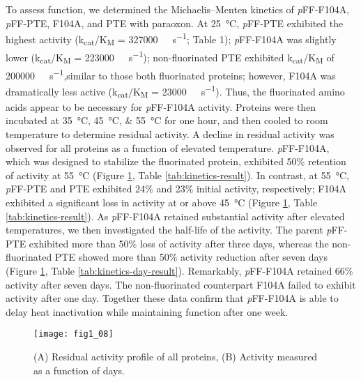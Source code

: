 \begin{refsection}
To assess function, we determined the Michaelis–Menten kinetics of
\emph{p}FF-F104A, \emph{p}FF-PTE, F104A, and PTE with paraoxon. At
\SI{25}{\celsius}, \emph{p}FF-PTE exhibited the highest activity
(k\textsubscript{cat}/K\textsubscript{M} = \SI{327000}{\per\Molar\per\second};
Table 1); \emph{p}FF-F104A was slightly lower
(k\textsubscript{cat}/K\textsubscript{M} = \SI{223000}{\per\Molar\per\second});
non-fluorinated PTE exhibited k\textsubscript{cat}/K\textsubscript{M} of
\SI{200000}{\per\Molar\per\second},similar to those both fluorinated proteins;
however, F104A was dramatically less active
(k\textsubscript{cat}/K\textsubscript{M} = \SI{23000}{\per\Molar\per\second}).
Thus, the fluorinated amino acids appear to be necessary for \emph{p}FF-F104A
activity.  Proteins were then incubated at \SIlist{35;45;55}{\celsius} for one
hour, and then cooled to room temperature to determine residual activity. A
decline in residual activity was observed for all proteins as a function of
elevated temperature. \emph{p}FF-F104A, which was designed to stabilize the
fluorinated protein, exhibited 50\% retention of activity at \SI{55}{\celsius}
(Figure \ref{fig:kinetics-fig}, Table \ref{tab:kinetics-result}). In contrast, at
\SI{55}{\celsius}, \emph{p}FF-PTE and PTE exhibited 24\% and 23\% initial
activity, respectively; F104A exhibited a significant loss in activity at or
above \SI{45}{\celsius} (Figure \ref{fig:kinetics-fig}, Table
\ref{tab:kinetics-result}). As \emph{p}FF-F104A retained substantial activity
after elevated temperatures, we then investigated the half-life of the
activity. The parent \emph{p}FF-PTE exhibited more than 50\% loss of activity
after three days, whereas the non-fluorinated PTE showed more than 50\%
activity reduction after seven days (Figure \ref{fig:kinetics-fig}, Table
\ref{tab:kinetics-day-result}).  Remarkably, \emph{p}FF-F104A retained 66\%
activity after seven days. The non-fluorinated counterpart F104A failed to
exhibit activity after one day.  Together these data confirm that
\emph{p}FF-F104A is able to delay heat inactivation while maintaining function
after one week.

\begin{figure}[h!] \centering \texttt{[image: fig1\_08]}
    \caption[(A) Residual activity profile of all proteins, (B) Activity
    measured as a function of days.]{(A) Residual activity profile of all
    proteins, (B) Activity measured as a function of days.} 
    \label{fig:kinetics-fig} 
\end{figure}


\end{refsection}
